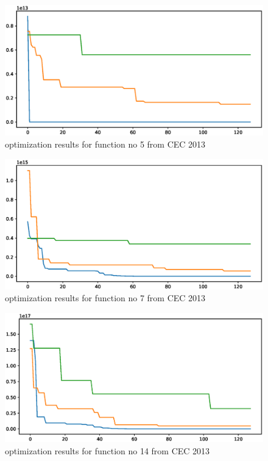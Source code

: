 \documentclass[11pt,a4paper]{article}
\begin{document}
\begin{figure}[H]
	\centering
	\includegraphics[scale=0.6]{cec2013_2.eps}
	\caption{optimization results for function no 5 from CEC 2013}
\end{figure}

\begin{figure}[H]
	\centering
	\includegraphics[scale=0.6]{cec2013_3.eps}
	\caption{optimization results for function no 7 from CEC 2013}
\end{figure}

\begin{figure}[H]
	\centering
	\includegraphics[scale=0.6]{cec2013_4.eps}
	\caption{optimization results for function no 14 from CEC 2013}
\end{figure}
\end{document}
